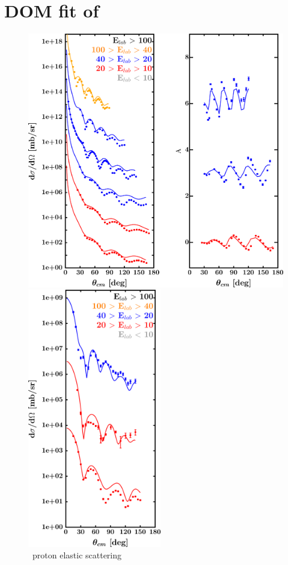 \section{DOM fit of \snFour}
\label{sn124DOMOutput}
\begin{figure}[hbtp]
    \centering
    \begin{minipage}{0.47\textwidth}
        \centering
        \includegraphics[width=\textwidth]{figures/sn124_protonElastic.png}
        \caption*{\snFour\ proton elastic scattering}
        \label{DOMFitData_sn124_proton_elastic}
    \end{minipage}\hspace{6pt}
    \begin{minipage}{0.47\textwidth}
        \centering
        \includegraphics[width=0.52\textwidth]{figures/sn124_neutronElastic.png}

\end{minipage}
\end{figure}
